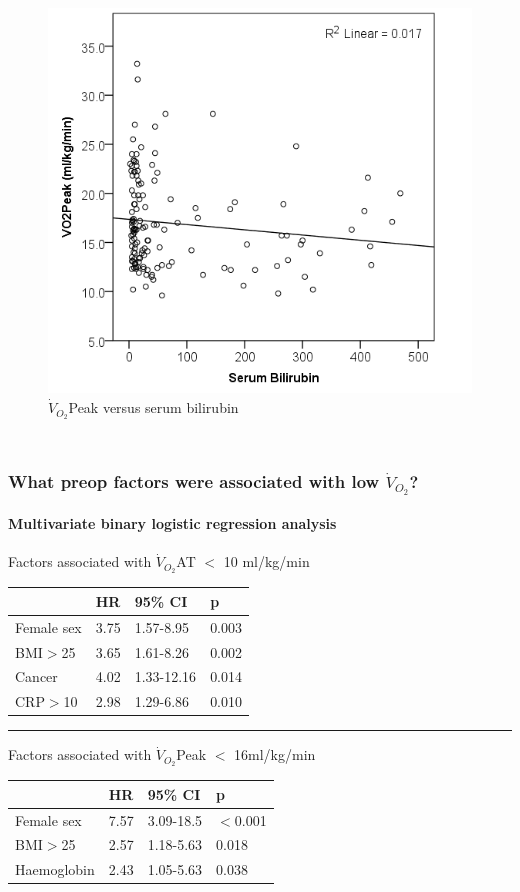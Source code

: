 \documentclass[10pt]{beamer}
\begin{document}
\begin{frame}
\begin{columns}[t]
		\begin{figure}
			\includegraphics[width=\textwidth]{../Figures/cpet_oj_scatter_peak_bil}
			\\ $\dot{V}_{O_2}$Peak versus serum bilirubin
		\end{figure}
	\end{columns}
\end{frame}


\begin{frame}
	\frametitle{What preop factors were associated with low $\dot{V}_{O_2}$?}
	\framesubtitle{Multivariate binary logistic regression analysis}
	Factors associated with $\dot{V}_{O_2}$AT $<$ 10 ml/kg/min
	\begin{table}
		\begin{tabular}{l| l l l}
			& HR   & 95\% CI    & p     \\ \hline
			Female sex & 3.75 & 1.57-8.95  & 0.003 \\
			BMI$>$25   & 3.65 & 1.61-8.26  & 0.002 \\
			Cancer     & 4.02 & 1.33-12.16 & 0.014 \\
			CRP$>$10   & 2.98 & 1.29-6.86  & 0.010
		\end{tabular}
	\end{table}
	\hrule
	\medskip
	Factors associated with $\dot{V}_{O_2}$Peak $<$ 16ml/kg/min
	\begin{table}
		\begin{tabular}{l| l l l}
			& HR   & 95\% CI   & p        \\ \hline
			Female sex  & 7.57 & 3.09-18.5 & $<$0.001 \\
			BMI$>$25    & 2.57 & 1.18-5.63 & 0.018    \\
			Haemoglobin & 2.43 & 1.05-5.63 & 0.038
		\end{tabular}
	\end{table}
\end{frame}
\end{document}
